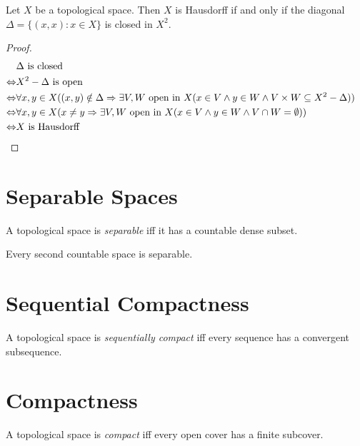 \begin{prop}
Let $X$ be a topological space. Then $X$ is Hausdorff if and only if the diagonal $\Delta = \{ (x,x) : x \in X \}$ is closed in $X^2$.
\end{prop}

\begin{proof}
\pf
\begin{align*}
& \Delta \text{ is closed} \\
\Leftrightarrow & X^2 - \Delta \text{ is open} \\
\Leftrightarrow & \forall x,y \in X ((x,y) \notin \Delta \Rightarrow \exists V,W \text{ open in } X (x \in V \wedge y \in W \wedge V \times W \subseteq X^2 - \Delta)) \\
\Leftrightarrow & \forall x,y \in X (x \neq y \Rightarrow \exists V,W \text{ open in } X (x \in V \wedge y \in W \wedge V \cap W = \emptyset)) \\
\Leftrightarrow & X \text{ is Hausdorff} & \qed
\end{align*}
\end{proof}

\section{Separable Spaces}

\begin{df}[Separable]
A topological space is \emph{separable} iff it has a countable dense subset.
\end{df}

Every second countable space is separable.

\section{Sequential Compactness}

\begin{df}
A topological space is \emph{sequentially compact} iff every sequence has a convergent subsequence.
\end{df}

\section{Compactness}

\begin{df}[Compact]
A topological space is \emph{compact} iff every open cover has a finite subcover.
\end{df}

